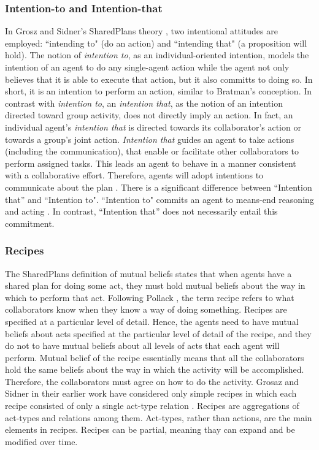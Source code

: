 \documentclass[11pt]{article}
\begin{document}
\subsubsection{Intention-to and Intention-that}

In Grosz and Sidner's SharedPlans theory \cite{grosz:plans-discourse}, two
intentional attitudes are employed: ``intending to" (do an action) and
``intending that" (a proposition will hold). The notion of \textit{intention
to}, as an individual-oriented intention, models the intention of an agent to do
any single-agent action while the agent not only believes that it is able to
execute that action, but it also committs to doing so. In short, it is an
intention to perform an action, similar to Bratman’s conception. In contrast
with \textit{intention to}, an \textit{intention that}, as the notion of an
intention directed toward group activity, does not directly imply an action. In
fact, an individual agent's \textit{intention that} is directed towards its
collaborator's action or towards a group's joint action. \textit{Intention that}
guides an agent to take actions (including the communication), that enable or
facilitate other collaborators to perform assigned tasks. This leads an agent to
behave in a manner consistent with a collaborative effort. Therefore, agents
will adopt intentions to communicate about the plan \cite{grosz:collaboration}.
There is a significant difference between ``Intention that'' and ``Intention
to". ``Intention to" commits an agent to means-end reasoning and acting
\cite{bratman:intentions-plans}. In contrast, ``Intention that'' does not
necessarily entail this commitment.

\subsubsection{Recipes}

The SharedPlans definition of mutual beliefs states that when agents have a
shared plan for doing some act, they must hold mutual beliefs about the way in
which to perform that act. Following Pollack
\cite{pollack:plan-mental-attitudes}, the term recipe refers to what
collaborators know when they know a way of doing something. Recipes are
specified at a particular level of detail. Hence, the agents need to have mutual
beliefs about acts specified at the particular level of detail of the recipe,
and they do not to have mutual beliefs about all levels of acts that each agent
will perform. Mutual belief of the recipe essentially means that all the
collaborators hold the same beliefs about the way in which the activity will be
accomplished. Therefore, the collaborators must agree on how to do the activity.
Grosaz and Sidner in their earlier work \cite{grosz:plans-discourse} have
considered only simple recipes in which each recipe consisted of only a single
act-type relation \cite{lochbaum:plan-models}. Recipes are aggregations of
act-types and relations among them. Act-types, rather than actions, are the main
elements in recipes. Recipes can be partial, meaning thay can expand and be
modified over time.
\end{document}
